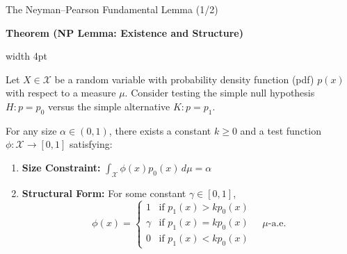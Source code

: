 \documentclass[10pt, aspectratio=169, xcolor=dvipsnames]{beamer}
\newcommand{\lead}[1]{{\color{UniBlue}\bfseries #1}}
\begin{document}
\begin{frame}{The Neyman--Pearson Fundamental Lemma (1/2)}
    
    \lead{Theorem (NP Lemma: Existence and Structure)}\\
    \vspace{0.2cm}

    \noindent
    {\color{Teal}\vrule width 4pt}%
    \hspace{10pt}%
    \begin{minipage}{\dimexpr\textwidth-14pt\relax}
        \color{Slate}
        Let $X \in \mathcal{X}$ be a random variable with probability density function (pdf) $p(x)$ with respect to a measure $\mu$. Consider testing the simple null hypothesis $H: p = p_0$ versus the simple alternative $K: p = p_1$.

        \smallskip
        For any size $\alpha \in (0, 1)$, there exists a constant $k \ge 0$ and a test function $\phi: \mathcal{X} \to [0, 1]$ satisfying:
        \begin{enumerate}
            \item[(i)] \lead{Size Constraint:}
            $\displaystyle\int_{\mathcal{X}} \phi(x) p_0(x) \, d\mu = \alpha$
            \item[(ii)] \lead{Structural Form:} For some constant $\gamma \in [0,1]$,
            \[
            \phi(x) = \begin{cases}
            1 & \text{if } p_1(x) > k p_0(x) \\
            \gamma & \text{if } p_1(x) = k p_0(x) \\
            0 & \text{if } p_1(x) < k p_0(x)
            \end{cases} \quad \mu\text{-a.e.}
            \]
        \end{enumerate}
    \end{minipage}
\end{frame}
\end{document}
